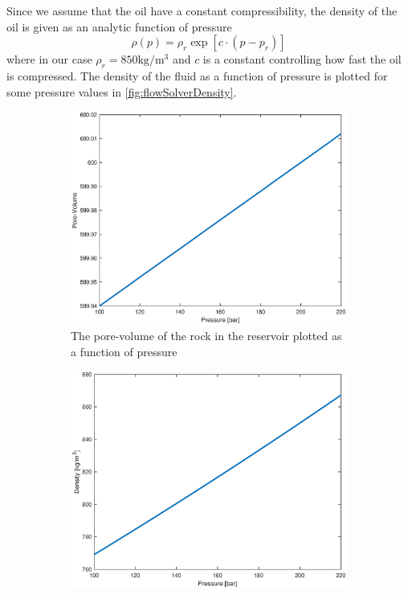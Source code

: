 Since we assume that the oil have a constant compressibility, the density of the oil is given as an analytic function of pressure 
\begin{equation}
    \rho(p) = \rho_r\exp[c\cdot(p-p_r)]
    \label{eq:pressureSolverDensity}
\end{equation}
where in our case $\rho_r = 850\text{kg}/\text{m}^3$ and $c$ is a constant controlling how fast the oil is compressed. The density of the fluid as a function of pressure is plotted for some pressure values in \autoref{fig:flowSolverDensity}.
\begin{figure}[htb]
    \centering
    \begin{subfigure}[t]{0.48\textwidth}
        \includegraphics[width=\textwidth]{figures/flow_solver_pore-volume.eps}
        \caption{The pore-volume of the rock in the reservoir plotted as a function of pressure}
        \label{fig:flowSolverDensity}
    \end{subfigure}
    \begin{subfigure}[t]{0.48\textwidth}
        \includegraphics[width=\textwidth]{figures/flow_solver_density.eps}

\end{subfigure}
\end{figure}
